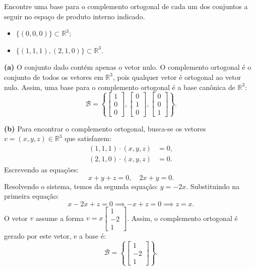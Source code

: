 \begin{question}
  Encontre uma base para o complemento ortogonal de cada um dos conjuntos a seguir no espaço de produto interno indicado.
  \begin{itemize}
    \item[(a)] $\{(0,0,0)\} \subset \mathbb{R}^3$;
    \item[(b)] $\{(1,1,1), (2,1,0)\} \subset \mathbb{R}^3$.
  \end{itemize}
\end{question}

\begin{resolution}

  {\bf (a)} O conjunto dado contém apenas o vetor nulo. O complemento ortogonal é o conjunto de todos os vetores em \( \mathbb{R}^3 \), pois qualquer vetor é ortogonal ao vetor nulo. Assim, uma base para o complemento ortogonal é a base canônica de \( \mathbb{R}^3 \):
  \[
    \mathcal{B} = \left\{ \begin{bmatrix} 1 \\ 0 \\ 0 \end{bmatrix}, \begin{bmatrix} 0 \\ 1 \\ 0 \end{bmatrix}, \begin{bmatrix} 0 \\ 0 \\ 1 \end{bmatrix} \right\}.
  \]

  {\bf (b)} Para encontrar o complemento ortogonal, busca-se os vetores \( v = (x, y, z) \in \mathbb{R}^3 \) que satisfazem:
  \[
    \begin{aligned}
      (1, 1, 1) \cdot (x, y, z) & = 0, \\
      (2, 1, 0) \cdot (x, y, z) & = 0.
    \end{aligned}
  \]
  Escrevendo as equações:
  \[
    x + y + z = 0, \quad 2x + y = 0.
  \]
  Resolvendo o sistema, temos da segunda equação: \( y = -2x \). Substituindo na primeira equação:
  \[
    x - 2x + z = 0 \implies -x + z = 0 \implies z = x.
  \]
  O vetor \( v \) assume a forma \( v = x \begin{bmatrix} 1 \\ -2 \\ 1 \end{bmatrix} \). Assim, o complemento ortogonal é gerado por este vetor, e a base é:
  \[
    \mathcal{B} = \left\{ \begin{bmatrix} 1 \\ -2 \\ 1 \end{bmatrix} \right\}.
  \]
\end{resolution}

